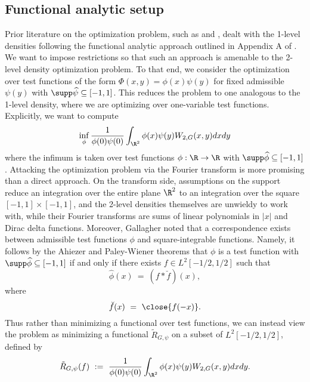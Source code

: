 \documentclass[12pt, reqno]{amsart}
\numberwithin{equation}{section}
\theoremstyle{definition}
\theoremstyle{remark}
\begin{document}
\subsection{Functional analytic setup}

Prior literature on the optimization problem, such as \cite{FreemanMiller} and \cite{FreemanThesis}, dealt with the 1-level densities following the functional analytic approach outlined in Appendix A of \cite{ILS}. We want to impose restrictions so that such an approach is amenable to the 2-level density optimization problem. To that end, we consider the optimization over test functions of the form $\Phi(x, y) = \phi(x) \psi(y)$ for fixed admissible $\psi(y)$ with $\supp \widehat\psi \subseteq [-1, 1]$. This reduces the problem to one analogous to the 1-level density, where we are optimizing over one-variable test functions. Explicitly, we want to compute
\begin{equation}
    \inf_\phi \frac{1}{\phi(0) \psi(0)} \int_{\R^2} \phi(x) \psi(y) W_{2, G} (x, y) dx dy \label{eq:2minimize}
\end{equation}
where the infimum is taken over test functions $\phi : \R \to \R$ with $\supp \widehat \phi \subseteq [-1, 1]$. Attacking the optimization problem via the Fourier transform is more promising than a direct approach. On the transform side, assumptions on the support reduce an integration over the entire plane $\R^2$ to an integration over the square $[-1, 1] \times [-1, 1]$, and the 2-level densities themselves are unwieldy to work with, while their Fourier transforms are sums of linear polynomials in $|x|$ and Dirac delta functions. Moreover, Gallagher \cite{Gallagher} noted that a correspondence exists between admissible test functions $\phi$ and square-integrable functions. Namely, it follows by the Ahiezer and Paley-Wiener theorems that $\phi$ is a test function with $\supp \widehat \phi \subseteq [-1, 1]$ if and only if there exists $f \in L^2 [-1/2, 1/2]$ such that
	\begin{equation}
		\widehat \phi (x) \ = \  (f * \breve{f} ) (x),
	\end{equation}	
where
	\begin{equation}
		\breve{f} (x) \ = \  \close{f( - x)}.
	\end{equation}	
Thus rather than minimizing a functional over test functions, we can instead view the problem as minimizing a functional $\tilde R_{G, \psi}$ on a subset of $L^2 [-1/2, 1/2]$, defined by
	\begin{equation}
		\tilde R_{G, \psi} (f) \ := \  \frac{1}{\phi(0) \psi(0)} \int_{\R^2} \phi(x) \psi(y) W_{2, G} (x, y) dx dy. \label{eq:originalfunctional}
	\end{equation}
\end{document}
